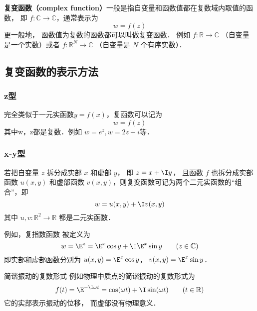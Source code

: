 
\begin{issues}
\issueTODO
\end{issues}

\textbf{复变函数（complex function）}一般是指自变量和函数值都在复数域内取值的函数， 即 $f:\mathbb C \to \mathbb C$，通常表示为
\begin{equation}
w = f(z)
\end{equation}
更一般地， 函数值为复数的函数都可以叫做复变函数． 例如 $f: \mathbb R \to \mathbb C$ （自变量是一个实数）或者 $f:\mathbb R^N \to \mathbb C$ （自变量是 $N$ 个有序实数）．

\subsection{复变函数的表示方法}
\subsubsection{z型}
完全类似于一元实函数$y=f(x)$，复函数可以记为
\begin{equation}
w = f(z)
\end{equation}
其中w，z都是复数．例如 $w=e^z, w=2z+i$等．

\subsubsection{x-y型}
若把自变量 $z$ 拆分成实部 $x$ 和虚部 $y$， 即 $z = x + \I y$， 且函数 $f$ 也拆分成实部函数 $u(x,y)$ 和虚部函数 $v(x,y)$，则复变函数可记为两个二元实函数的“组合”，即
\begin{equation}\label{Cplx_eq1}
w = u(x,y) + \I v(x,y)
\end{equation}
其中 $u, v: \mathbb R^2 \to \mathbb R$ 都是二元实函数． 

例如，复指数函数 被定义为
\begin{equation}\label{Cplx_eq3}
w = \E^z = \E^x \cos y + \I \E^x\sin y \qquad (z \in \mathbb C)
\end{equation}
即实部和虚部函数分别为 $u(x, y) = \E^x \cos y$， $v(x, y) = \E^x \sin y$．

\begin{example}{简谐振动的复数形式}
例如物理中质点的简谐振动的复数形式为
\begin{equation}
f(t) = \E^{-\I \omega t} = \cos(\omega t) + \I \sin(\omega t) \qquad (t \in \mathbb R)
\end{equation}
它的实部表示振动的位移， 而虚部没有物理意义．
\end{example}

